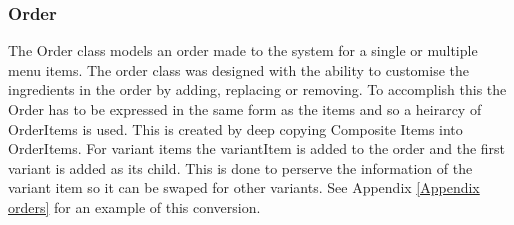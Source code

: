 \subsubsection{Order} \label{subsubsec:Order}

	\begin{minipage}[t]{.6\linewidth}
		The Order class models an order made to the system for a single or multiple menu items. The order class was designed with the ability to customise the ingredients in the order by adding, replacing or removing. To accomplish this the Order has to be expressed in the same form as the items and so a heirarcy of OrderItems is used. This is created by deep copying Composite Items into OrderItems. For variant items the variantItem is added to the order and the first variant is added as its child. This is done to perserve the information of the variant item so it can be swaped for other variants. See Appendix \ref{Appendix orders} for an example of this conversion.
	\end{minipage}
	\hspace{0.02\linewidth}
